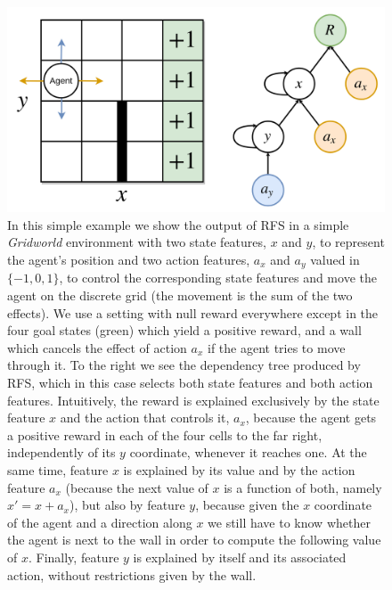 \begin{figure}
\includegraphics[width=\textwidth]{pictures/rfs_grid}
\centering
\caption[RFS on \textit{Gridworld}]{In this simple example we show the output
				    of RFS in a simple \textit{Gridworld} 
				    environment with two state features, $x$
				    and $y$, to represent the agent's position 
				    and two action features, $a_x$
				    and $a_y$ valued in $\{-1, 0, 1\}$, to 
				    control the corresponding state features and
				    move the agent on the discrete grid (the 
				    movement is the sum of the two effects). We 
				    use a setting with null reward everywhere
				    except in the four goal states (green) which
				    yield a positive reward, and a wall which cancels 
				    the effect of action $a_x$ if the agent 
				    tries to move through it.
				    To the right we see the dependency tree 
				    produced by RFS, which in this case selects
				    both state features and both action features.
				    Intuitively, the reward is explained 
				    exclusively by the state feature $x$ and the
				    action that controls it, $a_x$, because the 
				    agent gets a positive reward in each of the 
				    four cells to the far right, independently
				    of its $y$ coordinate, whenever it reaches 
				    one. At the same time, 
				    feature $x$ is explained by its value and
				    by the action feature $a_x$ (because
				    the next value of $x$ is a function of both,
				    namely $x' = x + a_x$), but also by feature 
				    $y$, because given the $x$ coordinate of the 
				    agent and a direction along $x$ we still 
				    have to know whether the agent is next to 
				    the wall in order to compute the following 
				    value of $x$. Finally, feature $y$ is 
				    explained by itself and its associated 
				    action, without restrictions given by 
				    the wall.}
\label{f:rfs_grid}
\end{figure}
%

